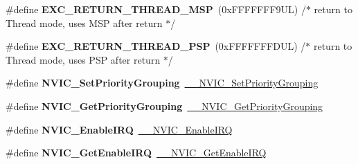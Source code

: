 \begin{DoxyCompactItemize}
\#define {\bfseries E\+X\+C\+\_\+\+R\+E\+T\+U\+R\+N\+\_\+\+T\+H\+R\+E\+A\+D\+\_\+\+M\+SP}~(0x\+F\+F\+F\+F\+F\+F\+F9\+U\+L)     /$\ast$ return to Thread mode, uses M\+S\+P after return                                $\ast$/
\item 
\mbox{\label{group___c_m_s_i_s___core___n_v_i_c_functions_ga9998daf0fbdf31dbc8f81cd604b58175}} 
\#define {\bfseries E\+X\+C\+\_\+\+R\+E\+T\+U\+R\+N\+\_\+\+T\+H\+R\+E\+A\+D\+\_\+\+P\+SP}~(0x\+F\+F\+F\+F\+F\+F\+F\+D\+U\+L)     /$\ast$ return to Thread mode, uses P\+S\+P after return                                $\ast$/
\item 
\mbox{\label{group___c_m_s_i_s___core___n_v_i_c_functions_ga0e798d5aec68cdd8263db86a76df788f}} 
\#define {\bfseries N\+V\+I\+C\+\_\+\+Set\+Priority\+Grouping}~\mbox{\hyperlink{group___c_m_s_i_s___core___n_v_i_c_functions_gafc94dcbaee03e4746ade1f5bb9aaa56d}{\+\_\+\+\_\+\+N\+V\+I\+C\+\_\+\+Set\+Priority\+Grouping}}
\item 
\mbox{\label{group___c_m_s_i_s___core___n_v_i_c_functions_ga4eeb9214f2264fc23c34ad5de2d3fa11}} 
\#define {\bfseries N\+V\+I\+C\+\_\+\+Get\+Priority\+Grouping}~\mbox{\hyperlink{group___c_m_s_i_s___core___n_v_i_c_functions_ga9b894af672df4373eb637f8288845c05}{\+\_\+\+\_\+\+N\+V\+I\+C\+\_\+\+Get\+Priority\+Grouping}}
\item 
\mbox{\label{group___c_m_s_i_s___core___n_v_i_c_functions_ga57b3064413dbc7459d9646020fdd8bef}} 
\#define {\bfseries N\+V\+I\+C\+\_\+\+Enable\+I\+RQ}~\mbox{\hyperlink{group___c_m_s_i_s___core___n_v_i_c_functions_ga71227e1376cde11eda03fcb62f1b33ea}{\+\_\+\+\_\+\+N\+V\+I\+C\+\_\+\+Enable\+I\+RQ}}
\item 
\mbox{\label{group___c_m_s_i_s___core___n_v_i_c_functions_ga857de13232ec65dd15087eaa15bc4a69}} 
\#define {\bfseries N\+V\+I\+C\+\_\+\+Get\+Enable\+I\+RQ}~\mbox{\hyperlink{group___c_m_s_i_s___core___n_v_i_c_functions_gaaeb5e7cc0eaad4e2817272e7bf742083}{\+\_\+\+\_\+\+N\+V\+I\+C\+\_\+\+Get\+Enable\+I\+RQ}}
\item 
\mbox{\label{group___c_m_s_i_s___core___n_v_i_c_functions_ga73b4e251f59cab4e9a5e234aac02ae57}} 

\end{DoxyCompactItemize}
